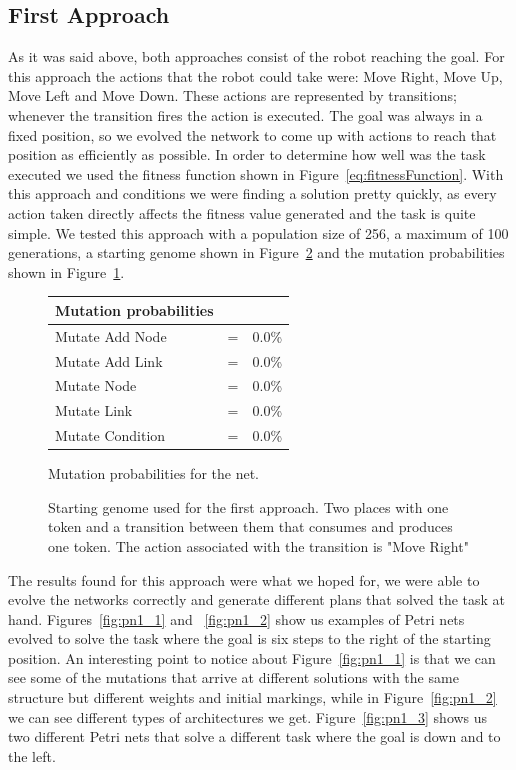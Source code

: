 \documentclass[12pt,a4paper,twocolumn]{article}
\begin{document}
\subsection{First Approach}
\label{subsec:firstApproach}
As it was said above, both approaches consist of the robot reaching the goal. For this approach the actions that the robot could take were: Move Right, Move Up, Move Left and Move Down. These actions are represented by transitions; whenever the transition fires the action is executed. The goal was always in a fixed position, so we evolved the network to come up with actions to reach that position as efficiently as possible. In order to determine how well was the task executed we used the fitness function shown in Figure~\ref{eq:fitnessFunction}. With this approach and conditions we were finding a solution pretty quickly, as every action taken directly affects the fitness value generated and the task is quite simple. We tested this approach with a population size of 256, a maximum of 100 generations, a starting genome shown in Figure~\ref{fig:genome} and the mutation probabilities shown in Figure~\ref{tab:probabilities}. 

\begin{figure} [b]
\centering
\begin{tabular}{|l c r|}
\hline
Mutation probabilities & & \\ \hline
Mutate Add Node & = & 0.0\% \\
Mutate Add Link & = & 0.0\% \\
Mutate Node & = & 0.0\% \\
Mutate Link & = & 0.0\% \\
Mutate Condition & = & 0.0\% \\
\hline
\end{tabular}
\caption{Mutation probabilities for the net.}
\label{tab:probabilities}
\end{figure}

\begin{figure} [h]
\centering
\caption{Starting genome used for the first approach. Two places with one token and a transition between them that consumes and produces one token. The action associated with the transition is "Move Right"}
\label{fig:genome}
\end{figure}

The results found for this approach were what we hoped for, we were able to evolve the networks correctly and generate different plans that solved the task at hand. Figures~\ref{fig:pn1_1} and ~\ref{fig:pn1_2} show us examples of Petri nets evolved to solve the task where the goal is six steps to the right of the starting position. An interesting point to notice about Figure~\ref{fig:pn1_1} is that we can see some of the mutations that arrive at different solutions with the same structure but different weights and initial markings, while in Figure~\ref{fig:pn1_2} we can see different types of architectures we get. Figure~\ref{fig:pn1_3} shows us two different Petri nets that solve a different task where the goal is down and to the left. 
\end{document}
